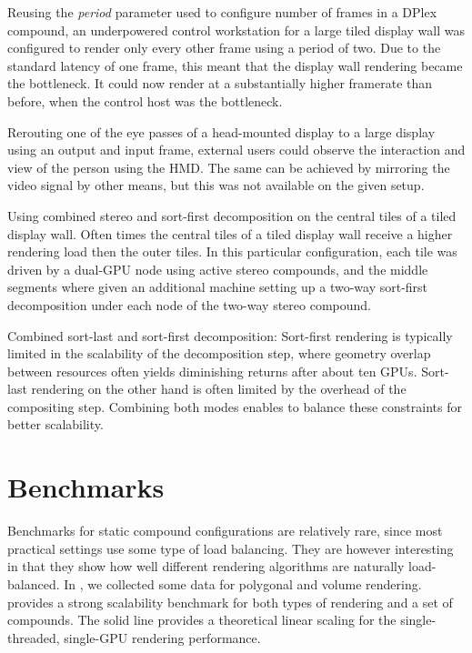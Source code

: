 \begin{compactitem}

\item Reusing the {\em period} parameter used to configure number of frames
in a DPlex compound, an underpowered control workstation for a large tiled
display wall was configured to render only every other frame using a period of
two. Due to the standard latency of one frame, this meant that the display wall
rendering became the bottleneck. It could now render at a substantially higher
framerate than before, when the control host was the bottleneck.

\item Rerouting one of the eye passes of a head-mounted display to a large
display using an output and input frame, external users could observe the
interaction and view of the person using the HMD. The same can be achieved by
mirroring the video signal by other means, but this was not available on the
given setup.

\item Using combined stereo and sort-first decomposition on the central tiles of
a tiled display wall. Often times the central tiles of a tiled display wall
receive a higher rendering load then the outer tiles. In this particular
configuration, each tile was driven by a dual-GPU node using active stereo
compounds, and the middle segments where given an additional machine setting up
a two-way sort-first decomposition under each node of the two-way stereo
compound.

\item Combined sort-last and sort-first decomposition: Sort-first rendering is
typically limited in the scalability of the decomposition step, where geometry
overlap between resources often yields diminishing returns after about ten
GPUs. Sort-last rendering on the other hand is often limited by the overhead of
the compositing step. Combining both modes enables to balance these constraints
for better scalability.

\end{compactitem}

\section{Benchmarks}

Benchmarks for static compound configurations are relatively rare, since most
practical settings use some type of load balancing. They are however
interesting in that they show how well different rendering algorithms are
naturally load-balanced. In \cite{ESP:18}, we collected some data for polygonal
and volume rendering.  provides a strong scalability benchmark
for both types of rendering and a set of compounds. The solid line provides a
theoretical linear scaling for the single-threaded, single-GPU rendering
performance.

